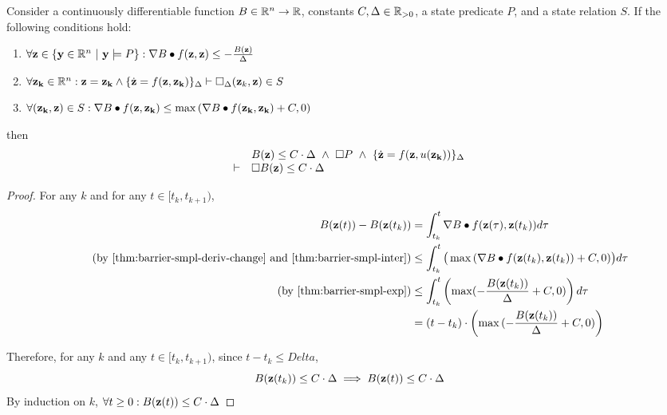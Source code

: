 \begin{theorem}
Consider a continuously differentiable function $B \in \mathbb{R}^n \rightarrow
\mathbb{R}$, constants $C,\Delta \in \mathbb{R}_{> 0}$, a state predicate $P$, and a state
relation $S$. If the following conditions hold:
\begin{enumerate}[label=\roman*), ref=\roman*]
\item
\label{thm:barrier-smpl-exp}
$\forall \mathbf{z} \in \{\mathbf{y} \in \mathbb{R}^n~|~\mathbf{y} \models P\} : \nabla B \bullet f(\mathbf{z},\mathbf{z}) \leq -\frac{B(\mathbf{z})}{\Delta}$
\item
\label{thm:barrier-smpl-inter}
$\forall \mathbf{z_k} \in \mathbb{R}^n : \mathbf{z} = \mathbf{z_k} \wedge \{\dot{\mathbf{z}} = f(\mathbf{z},\mathbf{z_k})\}_{\Delta} \vdash \Box{}_{\Delta} (\mathbf{z}_k,\mathbf{z}) \in S$
\item
\label{thm:barrier-smpl-deriv-change}
$\forall (\mathbf{z_k}, \mathbf{z}) \in S : \nabla B \bullet f(\mathbf{z},\mathbf{z_k}) \leq \max{(\nabla B \bullet f(\mathbf{z_k},\mathbf{z_k}) + C,0)}$
\end{enumerate}
then
\[
\begin{array}{cl}
&
B(\mathbf{z}) \leq C \cdot \Delta~\wedge~
\Box{} P~\wedge~
\{\dot{\mathbf{z}} = f(\mathbf{z},u(\mathbf{z_k}))\}_{\Delta} \\
\vdash
&
\Box{} B(\mathbf{z}) \leq C \cdot \Delta
\end{array}
\]
\label{thm:barrier-smpl}
\end{theorem}
\begin{proof}
For any $k$ and for any $t \in [t_k, t_{k+1})$,
\begin{align}
\nonumber
B(\vecbold{z}(t)) - B(\vecbold{z}(t_k)) &= \int_{t_k}^t \nabla B \dotprod f(\vecbold{z}(\tau),\vecbold{z}(t_k)) d\tau\\
\tag{by~\eqref{thm:barrier-smpl-deriv-change} and~\eqref{thm:barrier-smpl-inter}}
&\leq \int_{t_k}^t \big(\max{(\nabla B \dotprod f(\vecbold{z}(t_k),\vecbold{z}(t_k)) + C,0)}\big) d\tau \\
\tag{by~\eqref{thm:barrier-smpl-exp}}
&\leq \int_{t_k}^t \left(\max({-\frac{B(\vecbold{z}(t_k))}{\Delta} + C,0)}\right) d\tau \\
\nonumber
&= (t - t_k) \cdot \left(\max{(-\frac{B(\vecbold{z}(t_k))}{\Delta} + C,0)}\right)
\end{align}

Therefore, for any $k$ and any $t \in [t_k,t_{k+1})$, since $t - t_k \leq Delta$,
\begin{equation}
B(\mathbf{z}(t_k)) \leq C\cdot \Delta \implies B(\mathbf{z}(t)) \leq C\cdot \Delta
\end{equation}
By induction on $k$, $\forall t \geq 0 : B(\mathbf{z}(t)) \leq C\cdot \Delta$
\end{proof}

